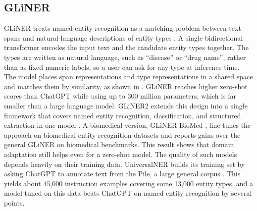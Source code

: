 \subsection{GLiNER}

GLiNER treats named entity recognition as a matching problem between text spans and
natural-language descriptions of entity types \citep{zaratiana2024gliner}. A single
bidirectional transformer encodes the input text and the candidate entity types together. The
types are written as natural language, such as ``disease'' or ``drug name'', rather than as
fixed numeric labels, so a user can ask for any type at inference time. The model places span
representations and type representations in a shared space and matches them by similarity, as
shown in .
GLiNER reaches higher zero-shot scores than ChatGPT while using up to 300 million parameters,
which is far smaller than a large language model. GLiNER2 extends this design into a single
framework that covers named entity recognition, classification, and
structured extraction in one model \citep{zaratiana2025gliner2}. A biomedical version,
GLiNER-BioMed \citep{zaratiana2025glinerbiomed}, fine-tunes the approach on biomedical entity
recognition datasets and reports gains over the general GLiNER on biomedical benchmarks. This
result shows that domain adaptation still helps even for a zero-shot model. The quality of
such models depends heavily on their training data. UniversalNER builds its training set by
asking ChatGPT to annotate text from the Pile, a large general corpus
\citep{zhou2024universalner}. This yields about 45{,}000 instruction examples covering some
13{,}000 entity types, and a model tuned on this data beats ChatGPT on named entity
recognition by several points.

